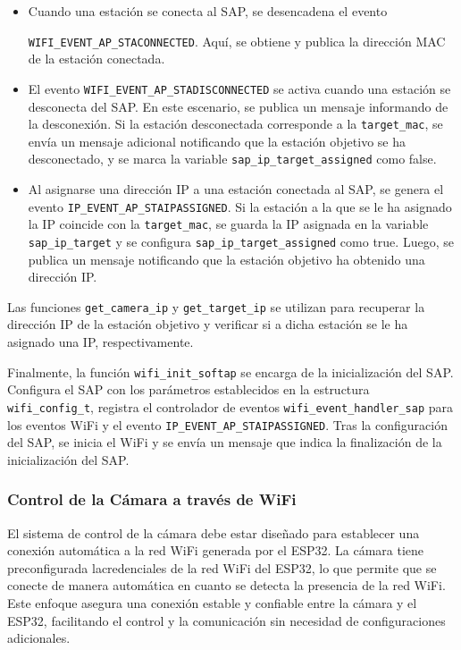\begin{itemize}
    \item Cuando una estación se conecta al SAP, se desencadena el evento
    
    \texttt{WIFI\_EVENT\_AP\_STACONNECTED}. Aquí, se obtiene y publica la dirección MAC de la estación conectada.
    \item El evento \texttt{WIFI\_EVENT\_AP\_STADISCONNECTED} se activa cuando una estación se desconecta del SAP. En este escenario, se publica un mensaje informando de la desconexión. Si la estación desconectada corresponde a la \texttt{target\_mac}, se envía un mensaje adicional notificando que la estación objetivo se ha desconectado, y se marca la variable \texttt{sap\_ip\_target\_assigned} como false.
    \item Al asignarse una dirección IP a una estación conectada al SAP, se genera el evento \texttt{IP\_EVENT\_AP\_STAIPASSIGNED}. Si la estación a la que se le ha asignado la IP coincide con la \texttt{target\_mac}, se guarda la IP asignada en la variable \texttt{sap\_ip\_target} y se configura \texttt{sap\_ip\_target\_assigned} como true. Luego, se publica un mensaje notificando que la estación objetivo ha obtenido una dirección IP.
\end{itemize}

Las funciones \texttt{get\_camera\_ip} y \texttt{get\_target\_ip} se utilizan para recuperar la dirección IP de la estación objetivo y verificar si a dicha estación se le ha asignado una IP, respectivamente.



Finalmente, la función \texttt{wifi\_init\_softap} se encarga de la inicialización del SAP. Configura el SAP con los parámetros establecidos en la estructura \texttt{wifi\_config\_t}, registra el controlador de eventos \texttt{wifi\_event\_handler\_sap} para los eventos WiFi y el evento \texttt{IP\_EVENT\_AP\_STAIPASSIGNED}. Tras la configuración del SAP, se inicia el WiFi y se envía un mensaje que indica la finalización de la inicialización del SAP.



\subsubsection{Control de la Cámara a través de WiFi}

El sistema de control de la cámara debe estar diseñado para establecer una conexión automática a la red WiFi generada por el ESP32. La cámara tiene preconfigurada lacredenciales de la red WiFi del ESP32, lo que permite que se conecte de manera automática en cuanto se detecta la presencia de la red WiFi. Este enfoque asegura una conexión estable y confiable entre la cámara y el ESP32, facilitando el control y la comunicación sin necesidad de configuraciones adicionales.

